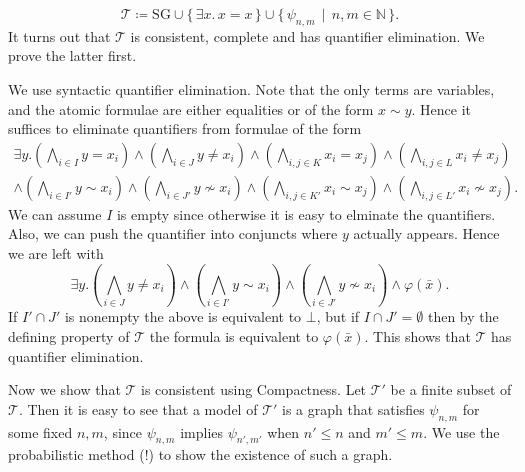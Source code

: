 \documentclass{article}
\begin{document}
\begin{enumerate}[leftmargin=*]
		\[
			\mathcal{T} \coloneqq \text{SG} \cup \{\,\exists x.\, x = x\,\} \cup \{\,\psi_{n,m} \,\mid\, n,m\in\mathbb{N}\,\}.
		\]
		It turns out that $\mathcal{T}$ is consistent, complete and has quantifier elimination. We prove the latter first.
		
		We use syntactic quantifier elimination. Note that the only terms are variables, and the atomic formulae are either equalities or of the form $x\sim y$. Hence it suffices to eliminate quantifiers from formulae of the form
		\begin{multline*}
			\exists y. \left(\bigwedge_{i\in I}y = x_i\right)\wedge\left(\bigwedge_{i\in J}y \neq x_i\right)\wedge \left(\bigwedge_{i,j\in K}x_i = x_j\right)\wedge\left(\bigwedge_{i,j\in L}x_i \neq x_j\right)\\
			\wedge\left(\bigwedge_{i\in I'}y \sim x_i\right)\wedge\left(\bigwedge_{i\in J'}y \not\sim x_i\right)\wedge \left(\bigwedge_{i,j\in K'}x_i \sim x_j\right)\wedge\left(\bigwedge_{i,j\in L'}x_i \not\sim x_j\right).
		\end{multline*}
		We can assume $I$ is empty since otherwise it is easy to elminate the quantifiers. Also, we can push the quantifier into conjuncts where $y$ actually appears. Hence we are left with
		\[
		\exists y.\left( \bigwedge_{i\in J} y \neq x_i \right) \wedge \left(\bigwedge_{i\in I'} y \sim x_i \right)\wedge \left(\bigwedge_{i\in J'} y\not\sim x_i\right) \wedge \varphi(\bar{x}).
		\]
		If $I'\cap J'$ is nonempty the above is equivalent to $\bot$, but if $I\cap J' = \emptyset$ then by the defining property of $\mathcal{T}$ the formula is equivalent to $\varphi(\bar{x})$. This shows that $\mathcal{T}$ has quantifier elimination.		
		
		Now we show that $\mathcal{T}$ is consistent using Compactness. Let $\mathcal{T}'$ be a finite subset of $\mathcal{T}$. Then it is easy to see that a model of $\mathcal{T}'$ is a graph that satisfies $\psi_{n,m}$ for some fixed $n,m$, since $\psi_{n,m}$ implies $\psi_{n',m'}$ when $n'\leq n$ and $m'\leq m$. We use the probabilistic method (!) to show the existence of such a graph.
		

\end{enumerate}
\end{document}
